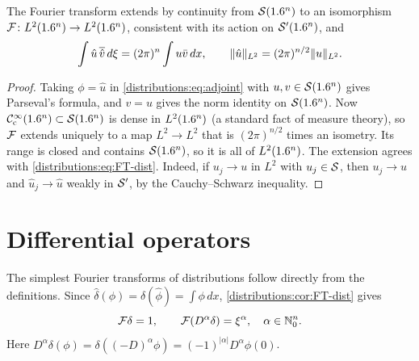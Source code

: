 \begin{proposition}[Plancherel]\label{distributions:prop:plancherel}
The Fourier transform extends by continuity from $\mathcal{S}(1.6^n)$ to an isomorphism
$\mathcal{F}\colon L^2(1.6^n)\to L^2(1.6^n)$, consistent with its action on $\mathcal{S}'(1.6^n)$, and
\[
  \int\hat u\,\overline{\hat v}\,d\xi=(2\pi)^n\int u\bar v\,dx,\qquad
  \lVert \hat u\rVert_{L^2}=(2\pi)^{n/2}\lVert u\rVert_{L^2}.
\]
\end{proposition}
\begin{proof}
Taking $\phi=\hat u$ in \eqref{distributions:eq:adjoint} with $u,v\in\mathcal{S}(1.6^n)$ gives
Parseval's formula, and $v=u$ gives the norm identity on $\mathcal{S}(1.6^n)$. Now
$\mathcal{C}^\infty_{\mathrm{c}}(1.6^n)\subset\mathcal{S}(1.6^n)$ is dense in $L^2(1.6^n)$ (a standard fact of measure
theory), so $\mathcal{F}$ extends uniquely to a map $L^2\to L^2$ that is $(2\pi)^{n/2}$ times an
isometry. Its range is closed and contains $\mathcal{S}(1.6^n)$, so it is all of $L^2(1.6^n)$.
The extension agrees with \eqref{distributions:eq:FT-dist}. Indeed, if $u_j\to u$ in
$L^2$ with $u_j\in\mathcal{S}$, then $u_j\to u$ and $\hat u_j\to\hat u$ weakly in $\mathcal{S}'$, by the
Cauchy--Schwarz inequality.
\end{proof}

\section{Differential operators}\label{distributions:sec:diffops}

The simplest Fourier transforms of distributions follow directly from the definitions.
Since $\hat\delta(\phi)=\delta(\hat\phi)=\int\phi\,dx$, \cref{distributions:cor:FT-dist}
gives
\begin{equation}\label{distributions:eq:FT-delta}
  \mathcal{F}\delta=1,\qquad\mathcal{F}(D^\alpha\delta)=\xi^\alpha,\quad\alpha\in\mathbb{N}_0^n.
\end{equation}
Here $D^\alpha\delta(\phi)=\delta((-D)^\alpha\phi)=(-1)^{|\alpha|}D^\alpha\phi(0)$.

